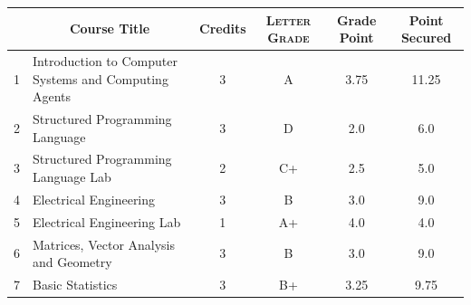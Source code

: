 \documentclass[11pt]{article}
\newcommand*{\numtwo}[1]{\pgfmathprintnumber[
                    fixed, precision=2, fixed zerofill=true]{#1}}
\begin{document}
                \begin{center}
                    \renewcommand{\arraystretch}{1.08}
                    
                \begin{tabular}{|c|l|c|>{\scshape}c|c|c|}
                \hline  \rule[-1ex]{0pt}{3.5ex} {\centering{\bf Course Code}} &  \multicolumn{1}{c|}{\textbf{Course Title}}  & {\bf Credits} & {\bf Letter Grade} & {\bf Grade Point} & {\bf Point Secured}  \\ 
                \hline   1 &  Introduction to Computer Systems and Computing Agents		 & 3 & A & 3.75 & 11.25 \\ %
                \hline   2 &  Structured Programming Language		 & 3 & D & 2.0 & 6.0 \\ %
                \hline   3 &  Structured Programming Language Lab		 & 2 & C+ & 2.5 & 5.0 \\ %
                \hline   4 &  Electrical Engineering		 & 3 & B & 3.0 & 9.0 \\ %
                \hline   5 &  Electrical Engineering Lab		 & 1 & A+ & 4.0 & 4.0 \\ %
                \hline   6 &  Matrices, Vector Analysis and Geometry		 & 3 & B & 3.0 & 9.0 \\ %
                \hline   7 &  Basic Statistics		 & 3 & B+ & 3.25 & 9.75 \\ %

\hline                %
                \end{tabular}
                \end{center}
                \renewcommand{\arraystretch}{1.03}
\end{document}
